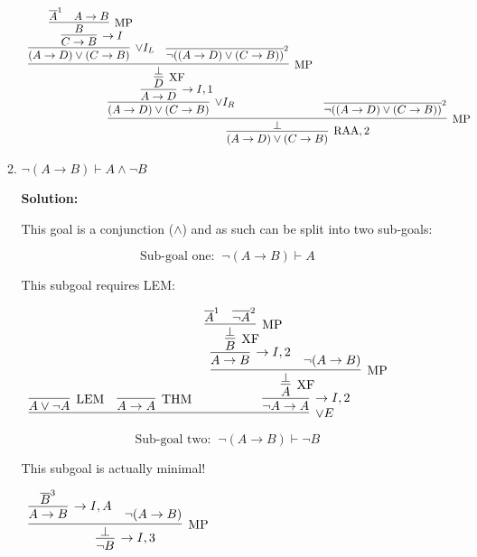 \documentclass[11pt]{report}
\newcommand{\temp}[2]{{\overline{#2}}^{#1}}
\begin{document}
\begin{enumerate}
\begin{enumerate}
		\begin{tiny}
		\begin{center}
			$\begin{array}{c}
				\infer[\RAA,2]{(A \to D) \lor (C \to B)}
					{\infer[\MP]{\bot}
						{\infer[\lor I_{R}]{(A \to D) \lor (C \to B)}
							{\infer[\to I,1]{A \to D}
								{\infer[\XF]{D}
									{\infer[\MP]{\bot}
										{\infer[\lor I_{L}]{(A \to D) \lor (C \to B)}
											{\infer[\to I]{C \to B}
												{\infer[\MP]{B}
													{\temp{1}{A}
													&
													A \to B}}}
										&
										\temp{2}{\lnot((A \to D) \lor (C \to B))}}}}}
						&
						\temp{2}{\lnot((A \to D) \lor (C \to B))}}}
			\end{array}$
		\end{center}
		\end{tiny}
		
		\newpage
		\item $\lnot (A \to B) \vdash A \land \lnot B$  
		
		\textbf{Solution:}

		This goal is a conjunction ($\land$) and as such can be split into two sub-goals: 

		$$\text{Sub-goal one: } \ \lnot (A \to B) \vdash A$$

		This subgoal requires LEM:

		\begin{center}
			$\begin{array}{c}
				\infer[\lor E]{}
					{\infer[\LEM]{A \lor \lnot A}{}
					&
					\infer[\THM]{A \to A}{}
					&
					\infer[\to I,2]{\lnot A \to A}
						{\infer[\XF]{A}
							{\infer[\MP]{\bot}
								{\infer[\to I,2]{A \to B}
									{\infer[\XF]{B}
										{\infer[\MP]{\bot}
											{\temp{1}{A}&\temp{2}{\lnot A}}}}
								&
								\lnot(A \to B)}}}}
			\end{array}$
		\end{center}

		$$\text{Sub-goal two: } \ \lnot (A \to B) \vdash \lnot B$$

		This subgoal is actually minimal!

		\begin{center}
			$\begin{array}{c}
				\infer[\to I,3]{\lnot B}
					{\infer[\MP]{\bot}
						{\infer[\to I, A]{A \to B}{\temp{3}{B}}
						&
						\lnot (A \to B)}}
			\end{array}$
		\end{center}


\end{enumerate}
\end{enumerate}
\end{document}
